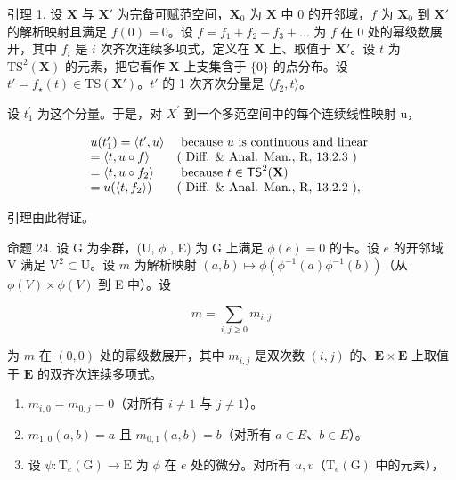 引理 1. 设 \(\mathbf{X}\) 与 \(\mathbf{X}'\) 为完备可赋范空间，\(\mathbf{X}_0\) 为 \(\mathbf{X}\) 中 0 的开邻域，\(f\) 为 \(\mathbf{X}_0\) 到 \(\mathbf{X}'\) 的解析映射且满足 \(f(0) = 0\)。设 \(f = f_1 + f_2 + f_3 + \dots\) 为 \(f\) 在 0 处的幂级数展开，其中 \(f_i\) 是 \(i\) 次齐次连续多项式，定义在 \(\mathbf{X}\) 上、取值于 \(\mathbf{X}'\)。设 \(t\) 为 \(\mathrm{TS}^2 (\mathbf{X})\) 的元素，把它看作 \(\mathbf{X}\) 上支集含于 \(\{0\}\) 的点分布。设 \(t' = f_{\star}(t) \in \mathrm{TS}(\mathbf{X}')\)。\(t'\) 的 1 次齐次分量是 \(\langle f_2, t \rangle\)。

设 \(t_{1}^{\prime}\) 为这个分量。于是，对 \(X^{\prime}\) 到一个多范空间中的每个连续线性映射 u，

\[
\begin{array}{l l} u (t _ {1} ^ {\prime}) = \langle t ^ {\prime}, u \rangle & \text { because   } u \text {   is   continuous   and   linear } \\ = \langle t, u \circ f \rangle & (\text { Diff.   \&   Anal.   Man.,   R,   13.2.3 }) \\ = \langle t, u \circ f _ {2} \rangle & \text { because   } t \in \mathsf {T S} ^ {2} (\mathbf {X}) \\ = u (\langle t, f _ {2} \rangle) & (\text { Diff.   \&   Anal.   Man.,   R,   13.2.2 }), \end{array}
\]

引理由此得证。

命题 24. 设 G 为李群，(U, \(\phi\) , E) 为 G 上满足 \(\phi(e) = 0\) 的卡。设 \(e\) 的开邻域 V 满足 \(\mathrm{V}^2 \subset \mathrm{U}\)。设 \(m\) 为解析映射 \((a, b) \mapsto \phi(\phi^{-1}(a)\phi^{-1}(b))\)（从 \(\phi(V) \times \phi(V)\) 到 E 中）。设

\[
m = \sum_ {i, j \geqslant 0} m _ {i, j}
\]

为 \(m\) 在 \((0,0)\) 处的幂级数展开，其中 \(m_{i,j}\) 是双次数 \((i,j)\) 的、\(\mathbf{E} \times \mathbf{E}\) 上取值于 \(\mathbf{E}\) 的双齐次连续多项式。

\begin{enumerate}
\def\labelenumi{(\roman{enumi})}
\item
  \(m_{i,0} = m_{0,j} = 0\)（对所有 \(i \neq 1\) 与 \(j \neq 1\)）。
\item
  \(m_{1,0}(a,b)=a\) 且 \(m_{0,1}(a,b)=b\)（对所有 \(a\in E\)、\(b\in E\)）。
\item
  设 \(\psi: \mathrm{T}_e(\mathrm{G}) \to \mathrm{E}\) 为 \(\phi\) 在 \(e\) 处的微分。对所有 \(u, v\)（\(\mathrm{T}_e(\mathrm{G})\) 中的元素），
\end{enumerate}

